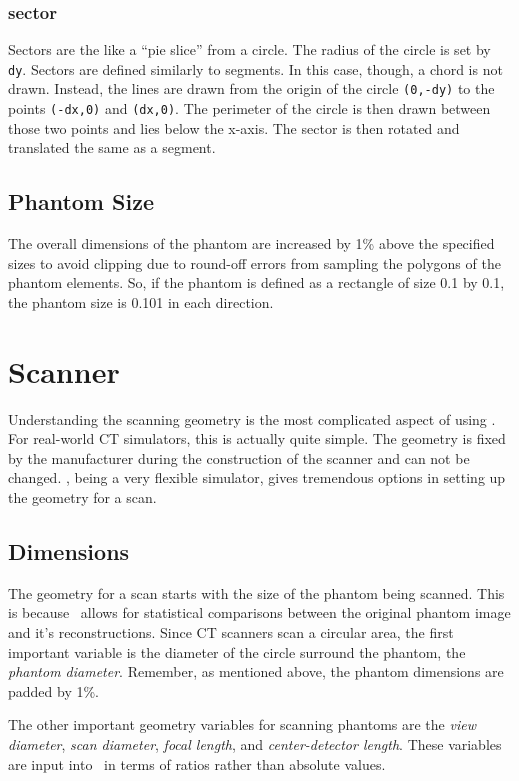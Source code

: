 \subsubsection{sector}
Sectors are the like a ``pie slice'' from a circle. The radius of
the circle is set by \texttt{dy}. Sectors are defined similarly to
segments. In this case, though, a chord is not drawn.  Instead,
the lines are drawn from the origin of the circle \texttt{(0,-dy)}
to the points \texttt{(-dx,0)} and \texttt{(dx,0)}. The perimeter
of the circle is then drawn between those two points and lies
below the x-axis. The sector is then rotated and translated the
same as a segment.

\subsection{Phantom Size}
The overall dimensions of the phantom are increased by 1\% above the
specified sizes to avoid clipping due to round-off errors from
sampling the polygons of the phantom elements.  So, if the phantom is
defined as a rectangle of size 0.1 by 0.1, the phantom size is
0.101 in each direction.

\section{Scanner}\label{conceptscanner}%
Understanding the scanning geometry is the most complicated aspect of
using \ctsim. For real-world CT simulators, this is actually quite
simple. The geometry is fixed by the manufacturer during the
construction of the scanner and can not be changed. \ctsim,
being a very flexible simulator, gives tremendous options in
setting up the geometry for a scan.

\subsection{Dimensions}
The geometry for a scan starts with the size of
the phantom being scanned. This is because \ctsim\ allows for
statistical comparisons between the original phantom image and
it's reconstructions. Since CT scanners scan a circular area, the
first important variable is the diameter of the circle surround
the phantom, the \emph{phantom diameter}. Remember, as mentioned
above, the phantom dimensions are padded by 1\%.

The other important geometry variables for scanning phantoms are
the \emph{view diameter}, \emph{scan diameter}, \emph{focal
length}, and \emph{center-detector length}. These variables are input into \ctsim\ in terms of
ratios rather than absolute values.

